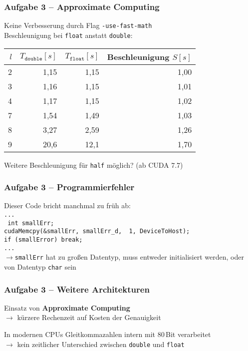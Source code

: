 \documentclass[german,notes,18pt]{beamer}
\begin{document}
	\begin{frame}
		\frametitle{Aufgabe 3 -- Approximate Computing}
		Keine Verbesserung durch Flag \texttt{-use-fast-math} \\
		\vspace{2em}
		Beschleunigung bei \texttt{float} anstatt \texttt{double}:
		\begin{center}
			\begin{tabular}{r|r|r|r}
				$l$ & $T_\mathtt{double}[s]$ & $T_\mathtt{float}[s]$ & Beschleunigung $S[s]$ \\
				\hline
				2 & 1,15 & 1,15 & 1,00 \\
				3 & 1,16 & 1,15 & 1,01 \\
				4 & 1,17 & 1,15 & 1,02 \\
				7 & 1,54 & 1,49 & 1,03 \\
				8 & 3,27 & 2,59 & 1,26 \\
				9 & 20,6 & 12,1 & 1,70
			\end{tabular}
		\end{center}
		\vspace{2em}
		Weitere Beschleunigung für \texttt{half} möglich? (ab CUDA 7.7)
	\end{frame}
	\begin{frame}
		\frametitle{Aufgabe 3 -- Programmierfehler}
		Dieser Code bricht manchmal zu früh ab: \\
		\vspace{1em}
		\texttt{... \\
			{ int} smallErr; \\
			cudaMemcpy(\&smallErr, smallErr\_d, { 1}, DeviceToHost); \\
			if (smallError) break; \\
			...} \\
		\vspace{2em}
		\pause
		$\rightarrow$\texttt{smallErr} hat zu großen Datentyp, muss entweder initialisiert werden, oder von Datentyp \texttt{char} sein
	\end{frame}
	\begin{frame}
		\frametitle{Aufgabe 3 -- Weitere Architekturen}
		Einsatz von \textbf{Approximate Computing} \\
		\hspace{2em} $\rightarrow$ kürzere Rechenzeit auf Kosten der Genauigkeit \\
		\vspace{2em}

		In modernen CPUs Gleitkommazahlen intern mit 80\,Bit verarbeitet \\
		\hspace{2em} $\rightarrow$ kein zeitlicher Unterschied zwischen \texttt{double} und \texttt{float}
		
	\end{frame}
\end{document}
